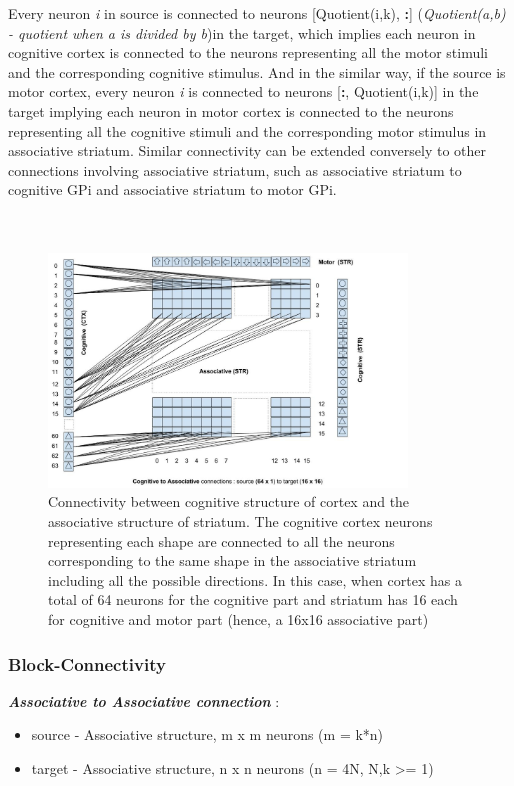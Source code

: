 \documentclass[11pt]{article}
\begin{document}
Every neuron \emph{i} in source is connected to neurons [Quotient(i,k), \textbf{:}] (\emph{Quotient(a,b) - quotient when a is divided by b})in the target, which implies each neuron in cognitive cortex is connected to the neurons representing all the motor stimuli and the corresponding cognitive stimulus. And in the similar way, if the source is motor cortex, every neuron \emph{i} is connected to neurons [\textbf{:}, Quotient(i,k)] in the target implying each neuron in motor cortex is connected to the neurons representing all the cognitive stimuli and the corresponding motor stimulus in associative striatum. 
	Similar connectivity can be extended conversely to other connections involving associative striatum, such as associative striatum to cognitive GPi and associative striatum to motor GPi. 
\\
\\
\\
\begin{figure}[ht]
\begin{center}
\includegraphics[width=0.85\textwidth]{CogToAssociative.jpg}
\caption[Cognitive (cortex) to Associative (striatum)]{Connectivity between cognitive structure of cortex and the associative structure of striatum. The cognitive cortex neurons representing each shape are connected to all the neurons corresponding to the same shape in the associative striatum including all the possible directions. In this case, when cortex has a total of 64 neurons for the cognitive part and striatum has 16 each for cognitive and motor part (hence, a 16x16 associative part)}
\end{center}
\end{figure}

\subsubsection{Block-Connectivity}
\textbf{\emph{Associative to Associative connection}} : 
\begin{itemize}
  \item source - Associative structure, m x m neurons (m = k*n)
  \item target - Associative structure, n x n neurons (n = 4N, {N,k} >= 1)
\end{itemize}  
\end{document}
